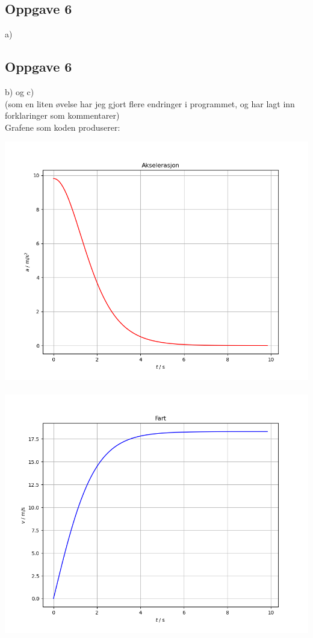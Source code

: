 \documentclass[11pt,a4paper]{report}
\newcommand{\opg}[1]{\subsection*{Oppgave #1}}
\begin{document}

\newpage
\opg{6}
a)\\


\newpage
\opg{6}
b) og c)\\
(som en liten øvelse har jeg gjort flere endringer i programmet, og har lagt inn forklaringer som kommentarer)\\


\newpage
Grafene som koden produserer:
\begin{center}
\includegraphics[scale=0.4]{6b1.png}\\\\
\includegraphics[scale=0.4]{6b2.png}\\\\

\end{center}
\end{document}
